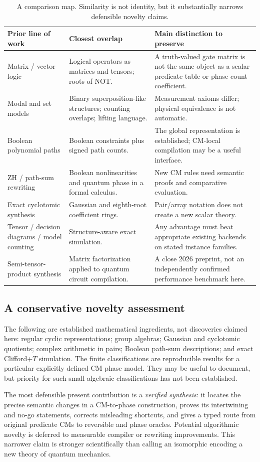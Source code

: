 \begin{table}[htbp]
\centering\small
\begin{tabularx}{\textwidth}{@{}L{0.26\textwidth}Y Y@{}}
\toprule
Prior line of work & Closest overlap & Main distinction to preserve\\
\midrule
Matrix / vector logic & Logical operators as matrices and tensors; roots of NOT. & A truth-valued gate matrix is not the same object as a scalar predicate table or phase-count coefficient.\\
Modal and set models & Binary superposition-like structures; counting overlaps; lifting language. & Measurement axioms differ; physical equivalence is not automatic.\\
Boolean polynomial paths & Boolean constraints plus signed path counts. & The global representation is established; CM-local compilation may be a useful interface.\\
ZH / path-sum rewriting & Boolean nonlinearities and quantum phase in a formal calculus. & New CM rules need semantic proofs and comparative evaluation.\\
Exact cyclotomic synthesis & Gaussian and eighth-root coefficient rings. & Pair/array notation does not create a new scalar theory.\\
Tensor / decision diagrams / model counting & Structure-aware exact simulation. & Any advantage must beat appropriate existing backends on stated instance families.\\
Semi-tensor-product synthesis & Matrix factorization applied to quantum circuit compilation. & A close 2026 preprint, not an independently confirmed performance benchmark here.\\
\bottomrule
\end{tabularx}
\caption{A comparison map. Similarity is not identity, but it substantially narrows defensible novelty claims.}
\end{table}

\subsection{A conservative novelty assessment}
The following are established mathematical ingredients, not discoveries claimed here: regular cyclic representations; group algebras; Gaussian and cyclotomic quotients; complex arithmetic in pairs; Boolean path-sum descriptions; and exact Clifford+$T$ simulation. The finite classifications are reproducible results for a particular explicitly defined CM phase model. They may be useful to document, but priority for such small algebraic classifications has not been established.

The most defensible present contribution is a \emph{verified synthesis}: it locates the precise semantic changes in a CM-to-phase construction, proves its intertwining and no-go statements, corrects misleading shortcuts, and gives a typed route from original predicate CMs to reversible and phase oracles. Potential algorithmic novelty is deferred to measurable compiler or rewriting improvements. This narrower claim is stronger scientifically than calling an isomorphic encoding a new theory of quantum mechanics.
